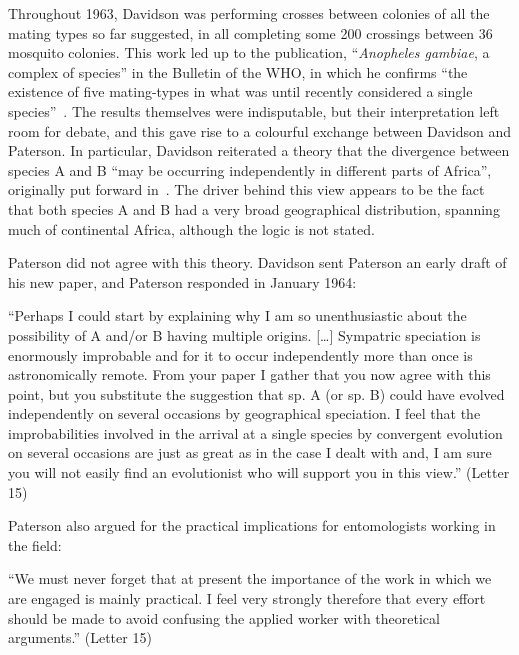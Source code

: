 \begin{refsection}
Throughout 1963, Davidson was performing crosses between colonies of all the mating types so far suggested, in all completing some 200 crossings between 36 mosquito colonies.
%
This work led up to the publication, ``\textit{Anopheles gambiae}, a complex of species'' in the Bulletin of the WHO, in which he confirms ``the existence of five mating-types in what was until recently considered a single species''~\parencite{Davidson1964}.
%
The results themselves were indisputable, but their interpretation left room for debate, and this gave rise to a colourful exchange between Davidson and Paterson.
In particular, Davidson reiterated a theory that the divergence between species A and B ``may be occurring independently in different parts of Africa'', originally put forward in~\textcite{Davidson1962a}.
%
The driver behind this view appears to be the fact that both species A and B had a very broad geographical distribution, spanning much of continental Africa, although the logic is not stated.


Paterson did not agree with this theory.
%
Davidson sent Paterson an early draft of his new paper, and Paterson responded in January 1964:


\begin{displayquote}
``Perhaps I could start by explaining why I am so unenthusiastic about the possibility of A and/or B having multiple origins. [\ldots] Sympatric speciation is enormously improbable and for it to occur independently more than once is astronomically remote. From your paper I gather that you now agree with this point, but you substitute the suggestion that sp. A (or sp. B) could have evolved independently on several occasions by geographical speciation. I feel that the improbabilities involved in the arrival at a single species by convergent evolution on several occasions are just as great as in the case I dealt with and, I am sure you will not easily find an evolutionist who will support you in this view.'' (Letter 15)
\end{displayquote}


Paterson also argued for the practical implications for entomologists working in the field:


\begin{displayquote}
``We must never forget that at present the importance of the work in which we are engaged is mainly practical. I feel very strongly therefore that every effort should be made to avoid confusing the applied worker with theoretical arguments.'' (Letter 15)
\end{displayquote}



\end{refsection}
